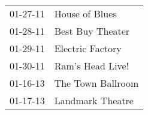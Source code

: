 \begin{supertabular}{p{0.25\columnwidth}p{0.75\columnwidth}}
 01-27-11 &     House of Blues \\
 01-28-11 &   Best Buy Theater \\
 01-29-11 &   Electric Factory \\
 01-30-11 &   Ram's Head Live! \\
 01-16-13 &  The Town Ballroom \\
 01-17-13 &   Landmark Theatre \\
\end{supertabular}
